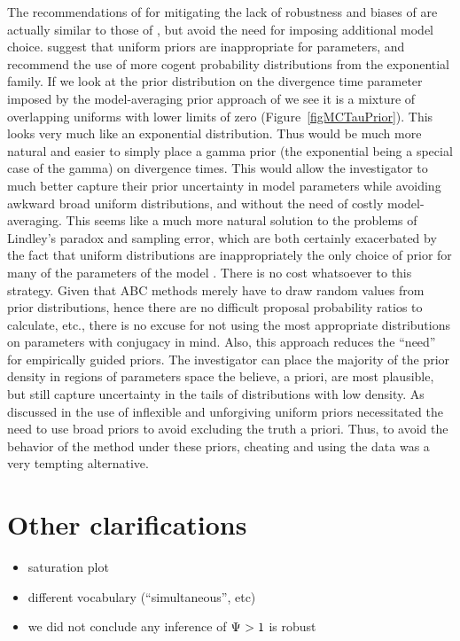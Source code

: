 \documentclass[letterpaper,12pt]{article}
\begin{document}
\begin{linenumbers}
The recommendations of \citet{Oaks2012} for mitigating the lack of robustness
and biases of \msb are actually similar to those of \citet{Hickerson2013},
but avoid the need for imposing additional model choice.
\citet{Oaks2012} suggest that uniform priors are inappropriate for parameters,
and recommend the use of more cogent probability distributions from the
exponential family.
If we look at the prior distribution on the divergence time parameter \divt{}
imposed by the model-averaging prior approach of \citet{Hickerson2013} we see
it is a mixture of overlapping uniforms with lower limits of zero
(Figure~\ref{figMCTauPrior}).
This looks very much like an exponential distribution.
Thus would be much more natural and easier to simply place a gamma prior (the
exponential being a special case of the gamma) on divergence times.
This would allow the investigator to much better capture their prior
uncertainty in model parameters while avoiding awkward broad uniform
distributions, and without the need of costly model-averaging.
This seems like a much more natural solution to the problems of Lindley's
paradox and sampling error, which are both certainly exacerbated by the fact
that uniform distributions are inappropriately the only choice of prior for
many of the parameters of the \msb model \citep[\divt{}, \ancestralTheta{},
, , \bottleTime{},
, , \locusMutationRateScalar,
\migrationRate{}, \recombinationRate;][]{Oaks2012}.
There is no cost whatsoever to this strategy.
Given that ABC methods merely have to draw random values from prior
distributions, hence there are no difficult proposal probability ratios to
calculate, etc., there is no excuse for not using the most appropriate
distributions on parameters with conjugacy in mind.
Also, this approach reduces the ``need'' for empirically guided priors.
The investigator can place the majority of the prior density in regions
of parameters space the believe, a priori, are most plausible, but still
capture uncertainty in the tails of distributions with low density.
As discussed in \citet{Oaks2012} the use of inflexible and unforgiving uniform
priors necessitated the need to use broad priors to avoid excluding the truth a
priori.
Thus, to avoid the   behavior of the method under these priors, cheating
and using the data was a very tempting alternative.



\section*{Other clarifications}
\begin{itemize}
    \item saturation plot
    \item different vocabulary (``simultaneous'', etc)
    \item we did not conclude any inference of $\Psi_{} > 1$ is robust
\end{itemize}


\end{linenumbers}
\end{document}
